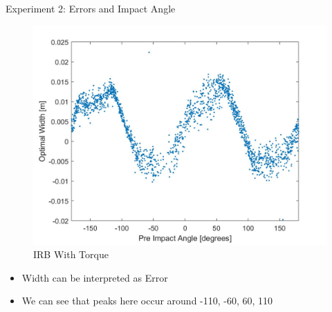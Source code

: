 \begin{frame}{Experiment 2: Errors and Impact Angle}
    
 \begin{figure}
 \centering
        \includegraphics[scale=0.12]{figures/IRBWidthAngle.jpg}
        \caption{IRB With Torque}
        \label{fig:IRBAngle}
\end{figure}
\vspace{-1\baselineskip}

\begin{itemize}
    \item Width can be interpreted as Error
    \item We can see that peaks here occur around -110, -60, 60, 110

\end{itemize}

\end{frame}


